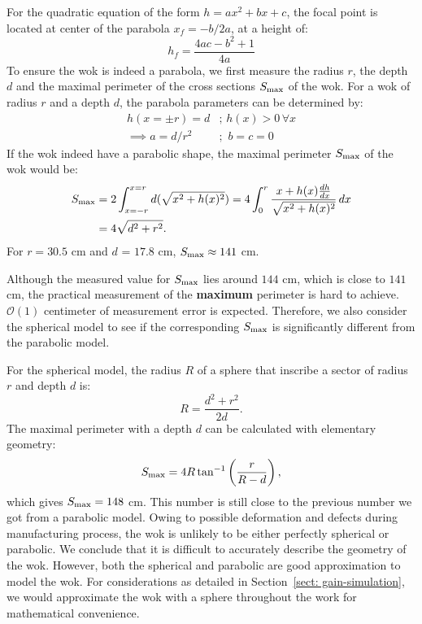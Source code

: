 \documentclass[12pt]{article}
\begin{document}
    For the quadratic equation of the form $h = ax^2 + bx + c$, the focal point is located at center of the parabola $x_f=-b/2a$, at a height of:
    \begin{equation} \label{eq: focal-parabola}
        h_f = \frac{4ac-b^2 + 1}{4a}
    \end{equation}
    To ensure the wok is indeed a parabola, we first measure the radius $r$, the depth $d$ and the maximal perimeter of the cross sections $S_{\rm max}$ of the wok.
    For a wok of radius $r$ and a depth $d$, the parabola parameters can be determined by:
    \begin{align}
        h(x= \pm r) = d &; \, h(x) > 0 \, \forall x \\
        \implies a = d/r^2 &; \,\, b=c=0 
    \end{align}
    If the wok indeed have a parabolic shape, the maximal perimeter $S_{\rm max}$ of the wok would be:
    \begin{equation}
    \begin{split}
        S_{\rm max} &= 2\int^{x=r}_{x=-r} d( \sqrt{x^2+h(x)^2} ) = 4\int^{r}_{0} \frac{x + h(x)\frac{dh}{dx} }{\sqrt{x^2+h(x)^2}} \, dx \\
        &= 4\sqrt{d^2+r^2}.
    \end{split} 
    \end{equation}
    For $r=30.5$ cm and $d$ = $17.8$ cm, $S_{\rm max} \approx 141 $ cm.
    
    Although the measured value for $S_{\rm max}$ lies around $144$ cm, which is close to $141$ cm, the practical measurement of the \textbf{maximum} perimeter is hard to achieve. $\mathcal{O}(1)$ centimeter of measurement error is expected. 
    Therefore, we also consider the spherical model to see if the corresponding $S_{\rm max}$ is significantly different from the parabolic model.
    
    For the spherical model, the radius $R$ of a sphere that inscribe a sector of radius $r$ and depth $d$ is:
    \begin{equation}
        R = \frac{d^2 + r^2}{2d}.
    \end{equation}
    The maximal perimeter with a depth $d$ can be calculated with elementary geometry:
    \begin{equation}
        S_{\rm max} = 4R \tan^{-1}\left( \frac{r}{R-d} \right),
    \end{equation}
    which gives $S_{\rm max} = 148$ cm.
    This number is still close to the previous number we got from a parabolic model. 
    Owing to possible deformation and defects during manufacturing process, the wok is unlikely to be either perfectly spherical or parabolic.
    We conclude that it is difficult to accurately describe the geometry of the wok.
    However, both the spherical and parabolic are good approximation to model the wok. 
    For considerations as detailed in Section~\ref{sect: gain-simulation}, we would approximate the wok with a sphere throughout the work for mathematical convenience.
    
	
	
\end{document}
